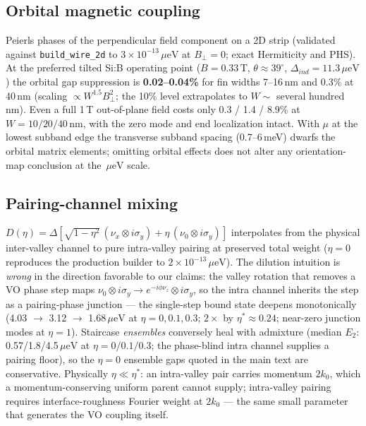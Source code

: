\documentclass[11pt]{article}
\newcommand{\ueV}{\,\mu\mathrm{eV}}
\newcommand{\nx}{\nu_x}\newcommand{\ny}{\nu_y}\newcommand{\nz}{\nu_z}
\begin{document}
\subsection{Orbital magnetic coupling}\label{s:orbital}
Peierls phases of the perpendicular field component on a 2D strip
(validated against \texttt{build\_wire\_2d} to $3\times10^{-13}\ueV$ at
$B_\perp = 0$; exact Hermiticity and PHS). At the preferred tilted Si:B
operating point ($B = 0.33$\,T, $\theta \approx 39^\circ$,
$\Delta_{ind} = 11.3\ueV$) the orbital gap suppression is
\textbf{0.02--0.04\%} for fin widths 7--16\,nm and 0.3\% at 40\,nm
(scaling $\propto W^{1.5}B_\perp^2$; the 10\% level extrapolates to
$W \sim$ several hundred nm). Even a full 1\,T out-of-plane field costs
only 0.3 / 1.4 / 8.9\% at $W = 10/20/40$\,nm, with the zero mode and end
localization intact. With $\mu$ at the lowest subband edge the transverse
subband spacing (0.7--6\,meV) dwarfs the orbital matrix elements; omitting
orbital effects does not alter any orientation-map conclusion at the
$\ueV$ scale.

\subsection{Pairing-channel mixing}\label{s:mix}
$D(\eta) = \Delta[\sqrt{1-\eta^2}\,(\nx\otimes i\sigma_y) +
\eta\,(\nu_0\otimes i\sigma_y)]$ interpolates from the physical
inter-valley channel to pure intra-valley pairing at preserved total
weight ($\eta = 0$ reproduces the production builder to
$2\times10^{-13}\ueV$). The dilution intuition is \emph{wrong} in the
direction favorable to our claims: the valley rotation that removes a VO
phase step maps $\nu_0\otimes i\sigma_y \to e^{-i\phi\nz}\otimes
i\sigma_y$, so the intra channel inherits the step as a pairing-phase
junction --- the single-step bound state deepens monotonically
(4.03 $\to$ 3.12 $\to$ 1.68$\ueV$ at $\eta = 0, 0.1, 0.3$; $2\times$ by
$\eta^* \approx 0.24$; near-zero junction modes at $\eta = 1$). Staircase
\emph{ensembles} conversely heal with admixture (median $E_2$:
0.57/1.8/4.5$\ueV$ at $\eta = 0/0.1/0.3$; the phase-blind intra channel
supplies a pairing floor), so the $\eta = 0$ ensemble gaps quoted in the
main text are conservative. Physically $\eta \ll \eta^*$: an intra-valley
pair carries momentum $2k_0$, which a momentum-conserving uniform parent
cannot supply; intra-valley pairing requires interface-roughness Fourier
weight at $2k_0$ --- the same small parameter that generates the VO
coupling itself.
\end{document}

